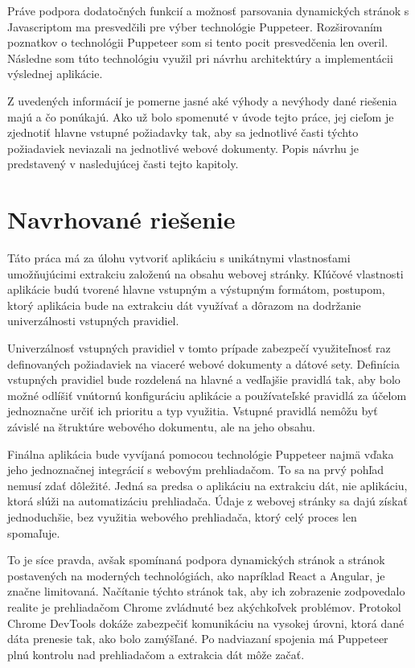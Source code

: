 Práve podpora dodatočných funkcií a možnosť parsovania dynamických stránok s Javascriptom ma presvedčili pre výber technológie Puppeteer. Rozširovaním poznatkov o technológii Puppeteer som si tento pocit presvedčenia len overil. Následne som túto technológiu využil pri návrhu architektúry a implementácii výslednej aplikácie.

\bigskip

Z uvedených informácií je pomerne jasné aké výhody a nevýhody dané riešenia majú a čo ponúkajú. Ako už bolo spomenuté v úvode tejto práce, jej cieľom je zjednotiť hlavne vstupné požiadavky tak, aby sa jednotlivé časti týchto požiadaviek neviazali na jednotlivé webové dokumenty. Popis návrhu je predstavený v nasledujúcej časti tejto kapitoly.

\newpage

\section{Navrhované riešenie}

Táto práca má za úlohu vytvoriť aplikáciu s unikátnymi vlastnosťami umožňujúcimi extrakciu založenú na obsahu webovej stránky. Kľúčové vlastnosti aplikácie budú tvorené hlavne vstupným a výstupným formátom, postupom, ktorý aplikácia bude na extrakciu dát využívať a dôrazom na dodržanie univerzálnosti vstupných pravidiel. 

Univerzálnosť vstupných pravidiel v tomto prípade zabezpečí využiteľnosť raz definovaných požiadaviek na viaceré webové dokumenty a dátové sety. Definícia vstupných pravidiel bude rozdelená na hlavné a vedľajšie pravidlá tak, aby bolo možné odlíšiť vnútornú konfiguráciu aplikácie a používateľské pravidlá za účelom jednoznačne určiť ich prioritu a typ využitia. Vstupné pravidlá nemôžu byť závislé na štruktúre webového dokumentu, ale na jeho obsahu.

Finálna aplikácia bude vyvíjaná pomocou technológie Puppeteer najmä vďaka jeho jednoznačnej integrácií s webovým prehliadačom. To sa na prvý pohľad nemusí zdať dôležité. Jedná sa predsa o aplikáciu na extrakciu dát, nie aplikáciu, ktorá slúži na automatizáciu prehliadača. Údaje z webovej stránky sa dajú získať jednoduchšie, bez využitia webového prehliadača, ktorý celý proces len spomaľuje. 

To je síce pravda, avšak spomínaná podpora dynamických stránok a stránok postavených na moderných technológiách, ako napríklad React a Angular, je značne limitovaná. Načítanie týchto stránok tak, aby ich zobrazenie zodpovedalo realite je prehliadačom Chrome zvládnuté bez akýchkoľvek problémov. Protokol Chrome DevTools dokáže zabezpečiť komunikáciu na vysokej úrovni, ktorá dané dáta prenesie tak, ako bolo zamýšľané. Po nadviazaní spojenia má Puppeteer plnú kontrolu nad prehliadačom a extrakcia dát môže začať. 


